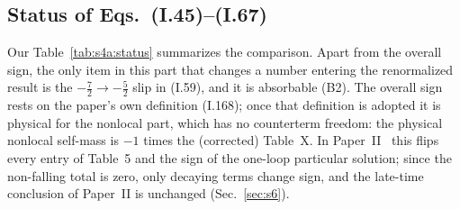 \documentclass[aps,prd,onecolumn,10pt,nofootinbib,floatfix]{revtex4-2}
\newcommand{\PII}{Paper~II}
\newcommand{\eqI}[1]{(I.#1)}
\begin{document}
\subsection{Status of Eqs.~(I.45)--(I.67)}
\label{sec:s4a:status}

Our Table~\ref{tab:s4a:status} summarizes the comparison. Apart from the overall sign, the only item in
this part that changes a number entering the renormalized result is the $-\frac72\to-\frac52$ slip in
\eqI{59}, and it is absorbable (B2). The overall sign rests on the paper's own definition \eqI{168}; once
that definition is adopted it is physical for the nonlocal part, which has no counterterm freedom: the
physical nonlocal self-mass is $-1$ times the (corrected) Table~X\@. In \PII~\cite{KW08} this flips every entry of Table~5 and the sign of the
one-loop particular solution; since the non-falling total is zero, only decaying terms change sign, and
the late-time conclusion of \PII{} is unchanged (Sec.~\ref{sec:s6}).
\end{document}

